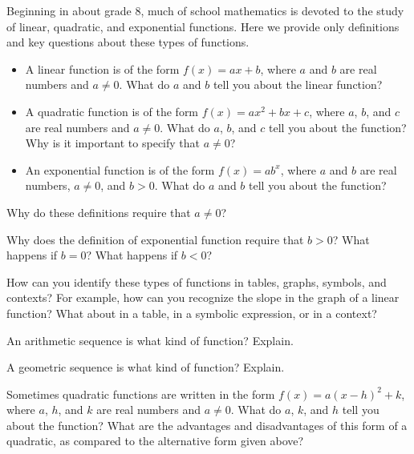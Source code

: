 Beginning in about grade 8, much of school mathematics is devoted to the study of linear, quadratic, and exponential functions.  Here we provide only definitions and key questions about these types of functions.  

\begin{itemize}
\item A linear function is of the form $f(x) = ax + b$, where $a$ and $b$ are real numbers and $a\ne 0$.  What do $a$ and $b$ tell you about the linear function?  
\item A quadratic function is of the form $f(x) = ax^2 + bx + c$, where $a$,  $b$, and $c$ are real numbers and $a\ne 0$.  What do $a$, $b$, and $c$ tell you about the function?  Why is it important to specify that $a\ne 0$? 
\item An exponential function is of the form $f(x)=ab^x$, where $a$ and $b$ are real numbers, $a\ne 0$, and $b>0$.  What do $a$ and $b$ tell you about the function? 
\end{itemize}

\begin{question}
Why do these definitions require that $a \ne 0$?  
\end{question}
\QM

\begin{question}
Why does the definition of exponential function require that $b > 0$?  What happens if $b=0$?  What happens if $b<0$?
\end{question}
\QM

How can you identify these types of functions in tables, graphs, symbols, and contexts?   
For example, how can you recognize the slope in the graph of a linear function?  What about in a table, in a symbolic expression, or in a context?  

\begin{question}
An arithmetic sequence is what kind of function?  Explain. 
\end{question}
\QM

\begin{question}
A geometric sequence is what kind of function?  Explain.  
\end{question}
\QM

\begin{question}
Sometimes quadratic functions are written in the form $f(x) = a(x-h)^2+k$, where $a$, $h$, and $k$ are real numbers and $a\ne 0$.  What do $a$, $k$, and $h$ tell you about the function?  What are the advantages and disadvantages of this form of a quadratic, as compared to the alternative form given above?  
\end{question}
\QM

